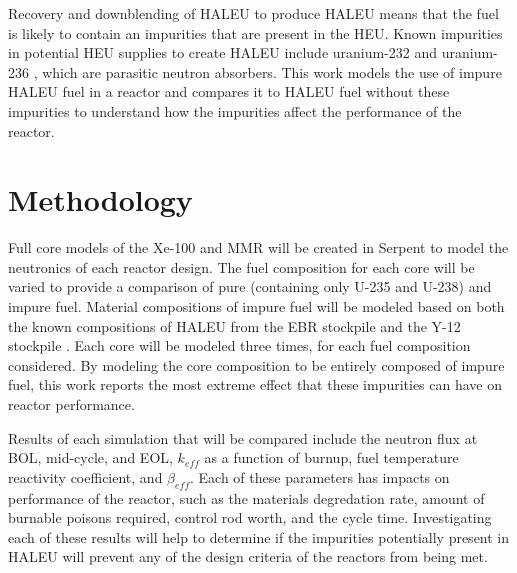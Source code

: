 Recovery and downblending of \gls{HALEU} to produce \gls{HALEU} means that 
the fuel is likely to contain an impurities that are present in the 
\gls{HEU}. Known impurities in potential \gls{HEU}
supplies to create \gls{HALEU} include uranium-232 and uranium-236
\cite{vaden_isotopic_2018,nelson_foreign_2010},  
which are parasitic neutron absorbers. This work models the use of 
impure \gls{HALEU} fuel in a reactor and compares it to \gls{HALEU} fuel 
without these impurities to understand how the impurities affect 
the performance of the reactor. 

\section{Methodology}
Full core models of the Xe-100 and \gls{MMR} will be created in Serpent 
\cite{leppanen_serpent_2014} to model the neutronics of each reactor 
design. The fuel composition for each core will be varied to provide 
a comparison of pure (containing only U-235 and U-238) and impure fuel.
Material compositions of impure fuel will be modeled based on both the 
known compositions of \gls{HALEU} from the \gls{EBR} stockpile 
\cite{vaden_isotopic_2018} and the Y-12 stockpile \cite{nelson_foreign_2010}.
Each core will be modeled three times, for each fuel composition considered.
By modeling the core composition to be entirely composed of impure fuel, 
this work reports the most extreme effect that these impurities can 
have on reactor performance.  

Results of each simulation that will be compared include the neutron flux at 
\gls{BOL}, mid-cycle, and \gls{EOL}, $k_{eff}$ as a function of burnup, 
fuel temperature reactivity coefficient, and 
$\beta_{eff}$. Each of these parameters has impacts on performance of 
the reactor, such as the materials degredation rate, amount of burnable 
poisons required, control rod worth, and the cycle time. Investigating 
each of these results will help to determine if the impurities potentially 
present in \gls{HALEU} will prevent any of the design criteria of the 
reactors from being met. 
